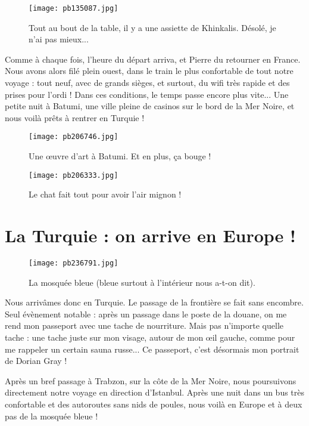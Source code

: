 \documentclass{book}
\begin{document}
\begin{figure}[h]
\centering
\texttt{[image: pb135087.jpg]}
\caption*{Tout au bout de la table, il y a une assiette de Khinkalis. Désolé, je n'ai pas mieux...}
\end{figure}

Comme à chaque fois, l'heure du départ arriva, et Pierre du retourner en France. Nous avons alors filé plein ouest, dans le train le plus confortable de tout notre voyage : tout neuf, avec de grands sièges, et surtout, du wifi très rapide et des prises pour l'ordi ! Dans ces conditions, le temps passe encore plus vite... Une petite nuit à Batumi, une ville pleine de casinos sur le bord de la Mer Noire, et nous voilà prêts à rentrer en Turquie !




\begin{figure}[h]
\centering
\texttt{[image: pb206746.jpg]}
\caption*{Une œuvre d'art à Batumi. Et en plus, ça bouge !}
\end{figure}


\begin{figure}[h]
\centering
\texttt{[image: pb206333.jpg]}
\caption*{Le chat fait tout pour avoir l'air mignon !}
\end{figure}





\chapter{La Turquie : on arrive en Europe !}


\begin{wrapfigure}{l}{0.55\textwidth}
\centering
\texttt{[image: pb236791.jpg]}
\caption*{La mosquée bleue (bleue surtout à l'intérieur nous a-t-on dit).}
\end{wrapfigure}


Nous arrivâmes donc en Turquie. Le passage de la frontière se fait sans encombre. Seul évènement notable : après un passage dans le poste de la douane, on me rend mon passeport avec une tache de nourriture. Mais pas n'importe quelle tache : une tache juste sur mon visage, autour de mon œil gauche, comme pour me rappeler un certain sauna russe... Ce passeport, c'est désormais mon portrait de Dorian Gray !


Après un bref passage à Trabzon, sur la côte de la Mer Noire, nous poursuivons directement notre voyage en direction d'Istanbul. Après une nuit dans un bus très confortable et des autoroutes sans nids de poules, nous voilà en Europe et à deux pas de la mosquée bleue !
\end{document}
